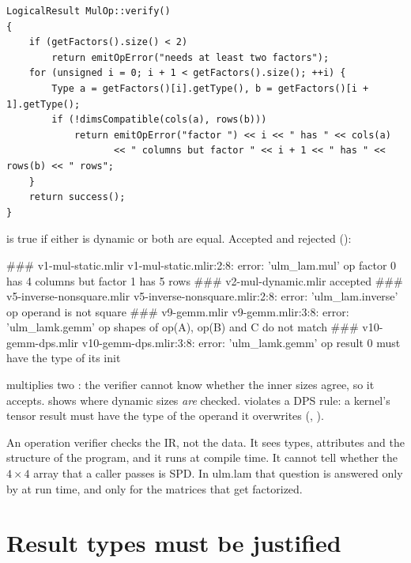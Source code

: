 \begin{lstlisting}[style=cpp]
LogicalResult MulOp::verify()
{
    if (getFactors().size() < 2)
        return emitOpError("needs at least two factors");
    for (unsigned i = 0; i + 1 < getFactors().size(); ++i) {
        Type a = getFactors()[i].getType(), b = getFactors()[i + 1].getType();
        if (!dimsCompatible(cols(a), rows(b)))
            return emitOpError("factor ") << i << " has " << cols(a)
                   << " columns but factor " << i + 1 << " has " << rows(b) << " rows";
    }
    return success();
}
\end{lstlisting}

 is true if either is dynamic or both are equal.
Accepted and rejected ():

\begin{textout}
### v1-mul-static.mlir
v1-mul-static.mlir:2:8: error: 'ulm_lam.mul' op factor 0 has 4 columns but factor 1 has 5 rows
### v2-mul-dynamic.mlir
accepted
### v5-inverse-nonsquare.mlir
v5-inverse-nonsquare.mlir:2:8: error: 'ulm_lam.inverse' op operand is not square
### v9-gemm.mlir
v9-gemm.mlir:3:8: error: 'ulm_lamk.gemm' op shapes of op(A), op(B) and C do not match
### v10-gemm-dps.mlir
v10-gemm-dps.mlir:3:8: error: 'ulm_lamk.gemm' op result 0 must have the type of its init
\end{textout}

 multiplies two : the verifier cannot know
whether the inner sizes agree, so it accepts.  shows where
dynamic sizes \emph{are} checked.  violates a DPS rule: a kernel's
tensor result must have the type of the operand it overwrites
(, ).

\begin{limit}
An operation verifier checks the IR, not the data. It sees types,
attributes and the structure of the program, and it runs at compile time.
It cannot tell whether the \(4\times 4\) array that a caller passes is SPD.
In ulm.lam that question is answered only by  at run time, and
only for the matrices that get factorized.
\end{limit}

\section{Result types must be justified}
\label{sec:infra-compat}


